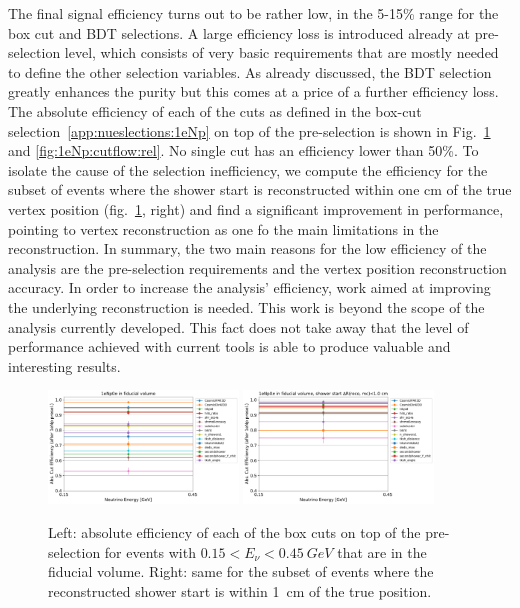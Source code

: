 The final signal efficiency turns out to be rather low, in the 5-15\% range for the box cut and BDT selections. A large efficiency loss is introduced already at pre-selection level, which consists of very basic requirements that are mostly needed to define the other selection variables. As already discussed, the BDT selection greatly enhances the purity but this comes at a price of a further efficiency loss. The absolute efficiency of each of the cuts as defined in the box-cut selection~\ref{app:nueslections:1eNp} on top of the pre-selection is shown in Fig.~\ref{fig:1eNp:abseff:RUN3} and \cref{fig:1eNp:cutflow:rel}. No single cut has an efficiency lower than 50\%. To isolate the cause of the selection inefficiency, we compute the efficiency for the subset of events where the shower start is reconstructed within one cm of the true vertex position (fig.~\ref{fig:1eNp:abseff:RUN3}, right) and find a significant improvement in performance, pointing to vertex reconstruction as one fo the main limitations in the reconstruction. In summary, the two main reasons for the low efficiency of the analysis are the pre-selection requirements and the vertex position reconstruction accuracy. In order to increase the analysis' efficiency, work aimed at improving the underlying reconstruction is needed. This work is beyond the scope of the analysis currently developed. This fact does not take away that the level of performance achieved with current tools is able to produce valuable and interesting results.

\begin{figure}[H]
\begin{center}
\includegraphics[width=0.45\textwidth]{1eNp/abseff_1eNp_cut_postpresel.pdf}
\includegraphics[width=0.45\textwidth]{1eNp/abseff_1eNp_cut_postpresel_drs.pdf}
\caption{\label{fig:1eNp:abseff:RUN3} Left: absolute efficiency of each of the box cuts on top of the pre-selection for \npsel events with $0.15<E_\nu<0.45~\si{GeV}$ that are in the fiducial volume. Right: same for the subset of events where the reconstructed shower start is within 1~\si{cm} of the true position. }
\end{center}
\end{figure}

